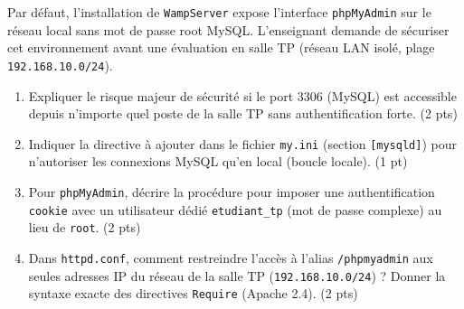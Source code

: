 \documentclass[11pt]{article}
\begin{document}
\begin{exercice}
Par défaut, l'installation de \texttt{WampServer} expose l'interface \texttt{phpMyAdmin} sur le réseau local sans mot de passe root MySQL. L'enseignant demande de sécuriser cet environnement avant une évaluation en salle TP (réseau LAN isolé, plage \texttt{192.168.10.0/24}).

\begin{enumerate}
    \item Expliquer le risque majeur de sécurité si le port 3306 (MySQL) est accessible depuis n'importe quel poste de la salle TP sans authentification forte. (2 pts)
    \item Indiquer la directive à ajouter dans le fichier \texttt{my.ini} (section \texttt{[mysqld]}) pour n'autoriser les connexions MySQL qu'en local (boucle locale). (1 pt)
    \item Pour \texttt{phpMyAdmin}, décrire la procédure pour imposer une authentification \texttt{cookie} avec un utilisateur dédié \texttt{etudiant\_tp} (mot de passe complexe) au lieu de \texttt{root}. (2 pts)
    \item Dans \texttt{httpd.conf}, comment restreindre l'accès à l'alias \texttt{/phpmyadmin} aux seules adresses IP du réseau de la salle TP (\texttt{192.168.10.0/24}) ? Donner la syntaxe exacte des directives \texttt{Require} (Apache 2.4). (2 pts)
\end{enumerate}
\end{exercice}
\end{document}
